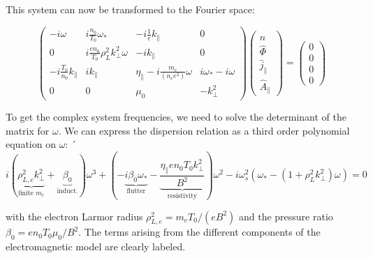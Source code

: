 This system can now be transformed to the Fourier space:

\begin{equation}
	\begin{pmatrix}
		-i\omega                  & i\frac{n_0}{T_0}\omega_*    & -i\frac{1}{e}k_\parallel & 0                  \\ 
		0                         & i\frac{en_0}{T_0}\rho_L^2k_\perp^2\omega        & -ik_\parallel            & 0                  \\ 
		-i\frac{T_0}{n_0}k_\parallel & ik_\parallel & \eta_\parallel - i\frac{m_e}{(n_ee^2)}\omega & i\omega_* - i\omega \\ 
		0                         & 0                             & \mu_0                   & -k_\perp^2
	\end{pmatrix}\begin{pmatrix}
		\hat{n} \\ \hat{\Phi} \\ \hat{j}_\parallel \\ \hat{A}_\parallel
	\end{pmatrix} = \begin{pmatrix}
		0 \\ 0 \\ 0 \\ 0
	\end{pmatrix}
\end{equation}

To get the complex system frequencies, we need to solve the determinant of the matrix for $\omega$. We can express the dispersion relation as a third order polynomial equation on $\omega$:
´\begin{equation}
	\label{eq:edge_DAWdispersionRelation}
	i\left(\underbrace{\rho_{L,e}^2k_\perp^2}_{\text{finite }m_e} + \underbrace{\beta_0}_{\text{induct.}}\right)\omega^3 + \left(-\underbrace{i\beta_0\omega_*}_{\text{flutter}} - \underbrace{\frac{\eta_\parallel en_0T_0k_\perp^2}{B^2}}_{\text{resistivity}}\right)\omega^2 - i\omega_s^2\left(\omega_*-\left(1 + \rho_L^2 k_\perp^2\right)\omega\right) = 0
\end{equation}

with the electron Larmor radius $\rho_{L,e}^2 = m_eT_0/(eB^2)$ and the pressure ratio $\beta_0 = en_0T_0 \mu_0 / B^2$. The terms arising from the different components of the electromagnetic model are clearly labeled. 



